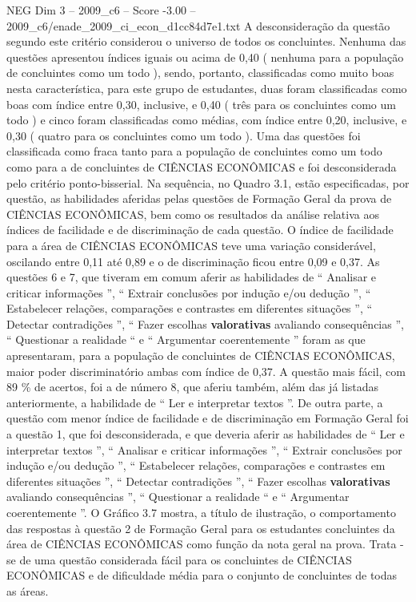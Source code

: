 \begin{textsample}{NEG Dim 3 – 2009\_c6 – Score -3.00 – 2009\_c6/enade\_2009\_ci\_econ\_d1cc84d7e1.txt}
A desconsideração da questão segundo este critério considerou o universo de todos os concluintes.
Nenhuma das questões apresentou índices iguais ou acima de 0,40 ( nenhuma para a população de concluintes como um todo ), sendo, portanto, classificadas como muito boas nesta característica, para este grupo de estudantes, duas foram classificadas como boas com índice entre 0,30, inclusive, e 0,40 ( três para os concluintes como um todo ) e cinco foram classificadas como médias, com índice entre 0,20, inclusive, e 0,30 ( quatro para os concluintes como um todo ).
Uma das questões foi classificada como fraca tanto para a população de concluintes como um todo como para a de concluintes de CIÊNCIAS ECONÔMICAS e foi desconsiderada pelo critério ponto-bisserial.
Na sequência, no Quadro 3.1, estão especificadas, por questão, as habilidades aferidas pelas questões de Formação Geral da prova de CIÊNCIAS ECONÔMICAS, bem como os resultados da análise relativa aos índices de facilidade e de discriminação de cada questão.
O índice de facilidade para a área de CIÊNCIAS ECONÔMICAS teve uma variação considerável, oscilando entre 0,11 até 0,89 e o de discriminação ficou entre 0,09 e 0,37.
As questões 6 e 7, que tiveram em comum aferir as habilidades de “ Analisar e criticar informações ”, “ Extrair conclusões por indução e/ou dedução ”, “ Estabelecer relações, comparações e contrastes em diferentes situações ”, “ Detectar contradições ”, “ Fazer escolhas \textbf{valorativas} avaliando consequências ”, “ Questionar a realidade “ e “ Argumentar coerentemente ” foram as que apresentaram, para a população de concluintes de CIÊNCIAS ECONÔMICAS, maior poder discriminatório ambas com índice de 0,37.
A questão mais fácil, com 89 \% de acertos, foi a de número 8, que aferiu também, além das já listadas anteriormente, a habilidade de “ Ler e interpretar textos ”.
De outra parte, a questão com menor índice de facilidade e de discriminação em Formação Geral foi a questão 1, que foi desconsiderada, e que deveria aferir as habilidades de “ Ler e interpretar textos ”, “ Analisar e criticar informações ”, “ Extrair conclusões por indução e/ou dedução ”, “ Estabelecer relações, comparações e contrastes em diferentes situações ”, “ Detectar contradições ”, “ Fazer escolhas \textbf{valorativas} avaliando consequências ”, “ Questionar a realidade “ e “ Argumentar coerentemente ”.
O Gráfico 3.7 mostra, a título de ilustração, o comportamento das respostas à questão 2 de Formação Geral para os estudantes concluintes da área de CIÊNCIAS ECONÔMICAS como função da nota geral na prova.
Trata -se de uma questão considerada fácil para os concluintes de CIÊNCIAS ECONÔMICAS e de dificuldade média para o conjunto de concluintes de todas as áreas.

\end{textsample}
